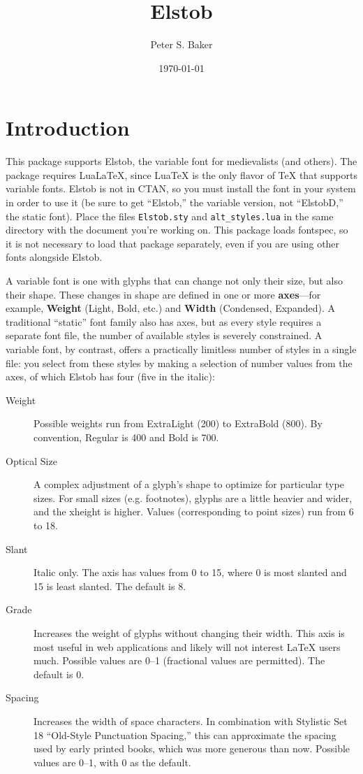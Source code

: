 \documentclass[12pt]{article}
\title{Elstob}
\author{Peter S. Baker}
\date{\today}
\newcommand{\ltech}{Lua\kern-1.5pt\TeX}
\newcommand{\lltech}{Lua\LaTeX}
\newcommand{\fspec}{{\sffamily fontspec}}
\newcommand{\src}[1]{{\color{BrickRed}\texttt{#1}}}
\begin{document}
\maketitle

\section{Introduction}

This package supports Elstob, the variable font for medievalists (and others).
The package requires \lltech, since {\ltech} is
the only flavor of {\TeX} that supports variable fonts. Elstob is not in CTAN, so you must
install the font in your system in order to use it (be sure to get “Elstob,” the variable
version, not “ElstobD,” the static font). Place the files \src{Elstob.sty} and
{\color{BrickRed}\verb|alt_styles.lua|} in the same
directory with the document you're working on. This package loads
\fspec, so it is not necessary to load that package separately, even if you are using
other fonts alongside Elstob.

A variable font is one with glyphs that can change not only their size, but also their
shape. These changes in shape are defined in one or more \textbf{axes}---for example,
\textbf{Weight} (Light, Bold, etc.) and \textbf{Width} (Condensed, Expanded). A traditional
“static” font family also has axes, but as every style requires a separate font file,
the number of available styles is severely constrained. A variable font, by contrast,
offers a practically limitless number of styles in a single file: you select from these styles
by making a selection of number values from the axes, of which Elstob has four (five in the italic):

\begin{description}
    \item[Weight] Possible weights run from ExtraLight (200) to ExtraBold (800). By
    convention, Regular is 400 and Bold is 700.
    \item[Optical Size] A complex adjustment of a glyph's shape to
    optimize for particular type sizes. For small sizes (e.g. footnotes), glyphs are
    a little heavier and wider, and the xheight is higher. Values (corresponding to
    point sizes) run from 6 to 18.
    \item[Slant] Italic only. The axis has values from 0 to 15, where 0 is most
    slanted and 15 is least slanted. The default is 8.
    \item[Grade] Increases the weight of glyphs without changing their width. This
    axis is most useful in web applications and likely will not interest {\LaTeX} users
    much. Possible values are 0–1 (fractional values are permitted). The default is 0.
    \item[Spacing] Increases the width of space characters. In combination with
    Stylistic Set 18 “Old-Style Punctuation Spacing,” this can approximate the
    spacing used by early printed books, which was more generous than now.
    Possible values are 0–1, with 0 as the default.
\end{description}
\end{document}
